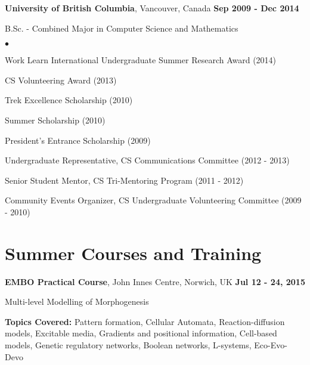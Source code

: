 \documentclass[margin,line]{res}
\newenvironment{list1}{
  \begin{list}{\ding{113}}{
      \setlength{\itemsep}{0in}
      \setlength{\parsep}{0in} \setlength{\parskip}{0in}
      \setlength{\topsep}{0in} \setlength{\partopsep}{0in} 
      \setlength{\leftmargin}{0.17in}}}{\end{list}}
\newenvironment{list2}{
  \begin{list}{$\bullet$}{
      \setlength{\itemsep}{0in}
      \setlength{\parsep}{0in} \setlength{\parskip}{0in}
      \setlength{\topsep}{0in} \setlength{\partopsep}{0in} 
      \setlength{\leftmargin}{0.2in}}}{\end{list}}
\newenvironment{list3}{
  \begin{list}{\textopenbullet}{
      \setlength{\itemsep}{0in}
      \setlength{\parsep}{0in} \setlength{\parskip}{0in}
      \setlength{\topsep}{0in} \setlength{\partopsep}{0in} 
      \setlength{\leftmargin}{0.1in}}}{\end{list}}
\begin{document}
\begin{resume}
{\bf University of British Columbia}, Vancouver, Canada  \hfill {\bf Sep 2009 - Dec 2014}\\
\vspace*{-.2cm}
\begin{list1}
\item[] B.Sc. - Combined Major in Computer Science and Mathematics
\begin{list2}
\vspace*{.1cm}
\item Work Learn International Undergraduate Summer Research Award (2014)
\item CS Volunteering Award (2013)
\item Trek Excellence Scholarship (2010)
\item Summer Scholarship (2010)
\item President's Entrance Scholarship (2009)
\begin{list3}
\vspace*{.1cm}
\item Undergraduate Representative, CS Communications Committee (2012 - 2013)
\item Senior Student Mentor, CS Tri-Mentoring Program (2011 - 2012)
\item Community Events Organizer, CS Undergraduate Volunteering Committee (2009 - 2010)
\end{list3}
\end{list2}
\end{list1}

\vspace*{.4cm}

\section{\sc Summer Courses and Training}

{\bf EMBO Practical Course}, John Innes Centre, Norwich, UK  \hfill {\bf Jul 12 - 24, 2015}\\
\vspace*{-.2cm}
\begin{list1}
\item[] Multi-level Modelling of Morphogenesis
\vspace*{0.2cm}
\item[] {\bf Topics Covered:} Pattern formation, Cellular Automata, Reaction-diffusion models, Excitable media, Gradients and positional information, Cell-based models, Genetic regulatory networks, Boolean networks, L-systems, Eco-Evo-Devo
\end{list1}


\end{resume}
\end{document}
